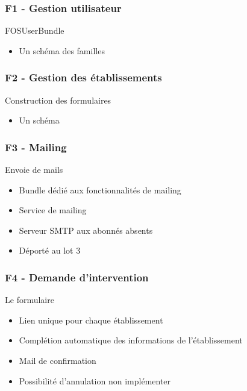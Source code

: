 \speaker{\Florian}

\begin{frame}
\frametitle{F1 - Gestion utilisateur}
\begin{block}{FOSUserBundle}
	\begin{itemize}
		\item Un schéma des familles
	\end{itemize}
\end{block}
\end{frame}

\begin{frame}
\frametitle{F2 - Gestion des établissements}
\begin{block}{Construction des formulaires}
	\begin{itemize}
		\item Un schéma
	\end{itemize}
\end{block}
\end{frame}

\begin{frame}
\frametitle{F3 - Mailing}
\begin{block}{Envoie de mails}
	\begin{itemize}
		\item Bundle dédié aux fonctionnalités de mailing
		\item Service de mailing
		\item Serveur SMTP aux abonnés absents
		\item Déporté au lot 3
	\end{itemize}
\end{block}
\end{frame}

\begin{frame}
\frametitle{F4 - Demande d'intervention}
\begin{block}{Le formulaire}
	\begin{itemize}
		\item Lien unique pour chaque établissement
		\item Complétion automatique des informations de l'établissement
		\item Mail de confirmation
		\item Possibilité d'annulation non implémenter
	\end{itemize}
\end{block}
\end{frame}